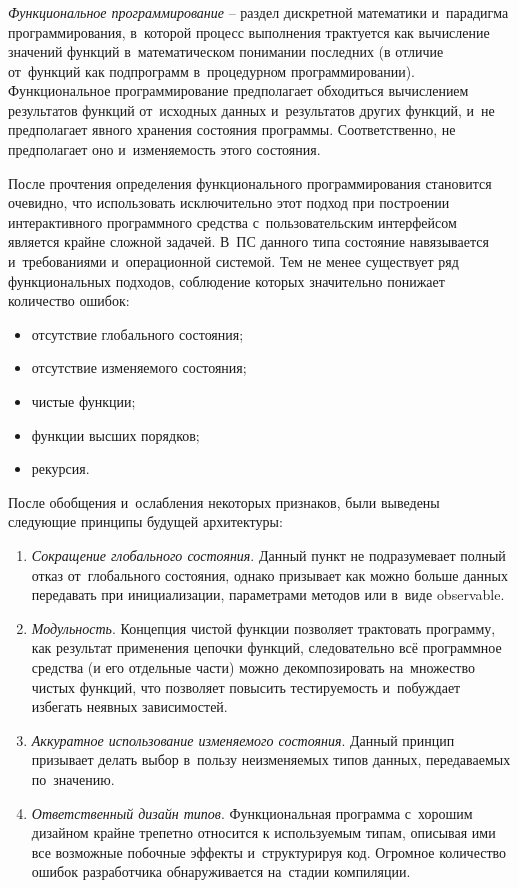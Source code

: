 \subsubsection{}
\label{sec:analysis:research:mobArch:fp}

\emph{Функциональное программирование} -- раздел дискретной математики и~парадигма программирования, в~которой процесс выполнения трактуется как вычисление значений функций в~математическом понимании последних (в отличие от~функций как подпрограмм в~процедурном программировании). Функциональное программирование предполагает обходиться вычислением результатов функций от~исходных данных и~результатов других функций, и~не предполагает явного хранения состояния программы. Соответственно, не предполагает оно и~изменяемость этого состояния\cite{wiki:fp}.

После прочтения определения функционального программирования становится очевидно, что использовать исключительно этот подход при построении интерактивного программного средства с~пользовательским интерфейсом является крайне сложной задачей. В~ПС данного типа состояние навязывается и~требованиями и~операционной системой. Тем не менее существует ряд функциональных подходов, соблюдение которых значительно понижает количество ошибок:

\begin{itemize}
\item отсутствие глобального состояния;
\item отсутствие изменяемого состояния;
\item чистые функции;
\item функции высших порядков;
\item рекурсия.
\end{itemize}

После обобщения и~ослабления некоторых признаков, были выведены следующие принципы будущей архитектуры:

\begin{enumerate}
\item \emph{Сокращение глобального состояния}. Данный пункт не подразумевает полный отказ от~глобального состояния, однако призывает как можно больше данных передавать при инициализации, параметрами методов или в~виде \gls{observable}.
\item \emph{Модульность}. Концепция чистой функции позволяет трактовать программу, как результат применения цепочки функций, следовательно всё программное средства (и его отдельные части) можно декомпозировать на~множество чистых функций, что позволяет повысить тестируемость и~побуждает избегать неявных зависимостей.
\item \emph {Аккуратное использование изменяемого состояния}. Данный принцип призывает делать выбор в~пользу неизменяемых типов данных, передаваемых по~значению. 
\item \emph {Ответственный дизайн типов}. Функциональная программа с~хорошим дизайном крайне трепетно относится к используемым типам, описывая ими все возможные побочные эффекты и~структурируя код. Огромное количество ошибок разработчика обнаруживается на~стадии компиляции.
\end{enumerate}

